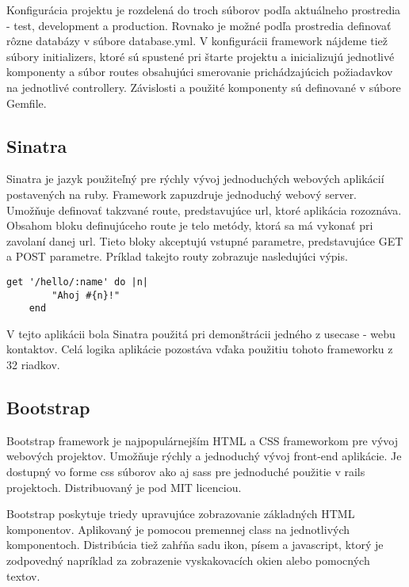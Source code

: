 	Konfigurácia projektu je rozdelená do troch súborov podľa aktuálneho prostredia - test, development a production. Rovnako je možné podľa prostredia definovať rôzne databázy v súbore database.yml.
	V konfigurácii framework nájdeme tiež súbory initializers, ktoré sú spustené pri štarte projektu a inicializujú jednotlivé komponenty a súbor routes obsahujúci smerovanie prichádzajúcich požiadavkov na jednotlivé controllery. Závislosti a použité komponenty sú definované v súbore Gemfile.
	
	\subsection{Sinatra}
	Sinatra je jazyk použiteľný pre rýchly vývoj jednoduchých webových aplikácií postavených na ruby. Framework zapuzdruje jednoduchý webový server. Umožňuje definovať takzvané route, predstavujúce url, ktoré aplikácia rozoznáva. Obsahom bloku definujúceho route je telo metódy, ktorá sa má vykonať pri zavolaní danej url. Tieto bloky akceptujú vstupné parametre, predstavujúce GET a POST parametre. Príklad takejto routy zobrazuje nasledujúci výpis.
	\begin{lstlisting}[label=lst:sinatra-sampel,caption=Príklad definovania GET route vo frameworku Sinatra]
	get '/hello/:name' do |n|
		"Ahoj #{n}!"
	end
	\end{lstlisting}
	V tejto aplikácii bola Sinatra použitá pri demonštrácii jedného z usecase - webu kontaktov. Celá logika aplikácie pozostáva vďaka použitiu tohoto frameworku z 32 riadkov.

	\subsection{Bootstrap}
	Bootstrap framework je najpopulárnejším HTML a CSS frameworkom pre vývoj webových projektov. Umožňuje rýchly a jednoduchý vývoj front-end aplikácie. Je dostupný vo forme css súborov ako aj sass pre jednoduché použitie v rails projektoch. Distribuovaný je pod MIT licenciou.
	
	Bootstrap poskytuje triedy upravujúce zobrazovanie základných HTML komponentov. Aplikovaný je pomocou premennej class na jednotlivých komponentoch. Distribúcia tiež zahŕňa sadu ikon, písem a javascript, ktorý je zodpovedný napríklad za zobrazenie vyskakovacích okien alebo pomocných textov. 
	
